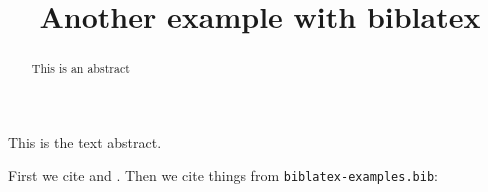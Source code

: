 \documentclass[journal=cic,version=final,biblatex]{iacrj}
\title{Another example with biblatex}
\begin{document}
\maketitle
\begin{abstract}
  This is an abstract
\end{abstract}
\begin{textabstract}
  This is the text abstract.
\end{textabstract}
First we cite \cite{sample} and \cite{noemph}.
Then we cite things from \texttt{biblatex-examples.bib}: 
\cite{kowalik}
\cite{westfahl:space}
\cite{aksin}
\cite{angenendt}
\cite{baez/article}
\cite{bertram}
\cite{doody}
\cite{matuz:doody}
\cite{gillies}
\cite{glashow}
\cite{herrmann}
\cite{kastenholz}
\cite{murray}
\cite{reese}
\cite{sarfraz}
\cite{shore}
\cite{sigfridsson}
\cite{spiegelberg}
\cite{springer}
\cite{weinberg}
\cite{yoon}
\cite{augustine}
\cite{averroes/bland}
\cite{averroes/hannes}
\cite{averroes/hercz}
\cite{cicero}
\cite{coleridge}
\cite{companion}
\cite{cotton}
\cite{gerhardt}
\cite{gonzalez}
\cite{hammond}
\cite{iliad}
\cite{knuth:ct:a}
\cite{knuth:ct:b}
\cite{knuth:ct:c}
\cite{knuth:ct:d}
\cite{knuth:ct:e}
\cite{kullback}
\cite{kullback:reprint}
\cite{malinowski}
\cite{maron}
\cite{massa}
\cite{moore}
\cite{nietzsche:ksa}
\cite{nietzsche:ksa1}
\cite{nussbaum}
\cite{piccato}
\cite{vangennep}
\cite{vangennep:trans}
\cite{wilde}
\cite{worman}
\cite{britannica}
\cite{gaonkar}
\cite{gaonkar:in}
\cite{westfahl:frontier}
\cite{kant:kpv}
\cite{kant:ku}
\cite{nietzsche:historie}
\cite{brandt}
\cite{hyman}
\cite{pines}
\cite{salam}
\cite{cms}
\cite{baez/online}
\cite{ctan}
\cite{itzhaki}
\cite{markey}
\cite{wassenberg}
\cite{almendro}
\cite{kowalik}
\cite{laufenberg}
\cite{sorace}
\cite{jcg}
\cite{chiu}
\cite{padhye}
\cite{geer}
\cite{loh}
\cite{deNeville1999}
\cite{vanDyke2007}
\cite{DickVanDyke2015}

\printbibliography
\end{document}
